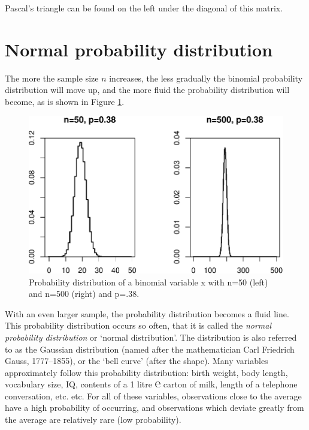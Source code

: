 \documentclass[
]{book}
\begin{document}
Pascal's triangle can be found on the left under the diagonal of this matrix.

\hypertarget{sec:normaldistribution}{%
\section{Normal probability distribution}\label{sec:normaldistribution}}

The more the sample size \(n\) increases, the less gradually the binomial probability
distribution will move up, and the more fluid the probability
distribution will become, as is shown in
Figure \ref{fig:binomprobabilitydistribution50n500}.

\begin{figure}
\centering
\includegraphics{QMS-EN_files/figure-latex/binomprobabilitydistribution50n500-1.pdf}
\caption{\label{fig:binomprobabilitydistribution50n500}Probability distribution of a binomial variable x with n=50 (left) and n=500 (right) and p=.38.}
\end{figure}

With an even larger sample, the probability distribution becomes a fluid line.
This probability distribution occurs so often, that it is called the
\emph{normal probability distribution} or `normal distribution'. The distribution
is also referred to as the Gaussian distribution (named after the mathematician
Carl Friedrich Gauss, 1777--1855), or the `bell curve' (after the shape). Many
variables approximately follow this probability distribution:
birth weight, body length, vocabulary size, IQ, contents of a 1 litre ℮ carton
of milk, length of a telephone conversation, etc. etc. For all of these variables,
observations close to the average have a high probability of occurring, and
observations which deviate greatly from the average are relatively rare (low
probability).
\end{document}
